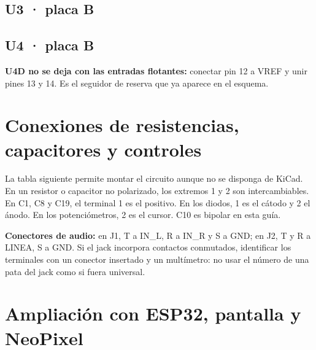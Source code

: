 \documentclass[10pt,a4paper]{article}
\begin{document}
\begin{minipage}[t]{.48\linewidth}\subsection*{U3 · placa B}\end{minipage}\hfill
\begin{minipage}[t]{.48\linewidth}\subsection*{U4 · placa B}\end{minipage}

\textbf{U4D no se deja con las entradas flotantes:} conectar pin 12 a VREF y unir pines 13 y 14. Es el seguidor de reserva que ya aparece en el esquema.

\clearpage
\section{Conexiones de resistencias, capacitores y controles}
La tabla siguiente permite montar el circuito aunque no se disponga de KiCad. En un resistor o capacitor no polarizado, los extremos 1 y 2 son intercambiables. En C1, C8 y C19, el terminal 1 es el positivo. En los diodos, 1 es el cátodo y 2 el ánodo. En los potenciómetros, 2 es el cursor. C10 es bipolar en esta guía.
{\small}

\textbf{Conectores de audio:} en J1, T a IN\_L, R a IN\_R y S a GND; en J2, T y R a LINEA, S a GND. Si el jack incorpora contactos conmutados, identificar los terminales con un conector insertado y un multímetro: no usar el número de una pata del jack como si fuera universal.

\section{Ampliación con ESP32, pantalla y NeoPixel}
\end{document}
